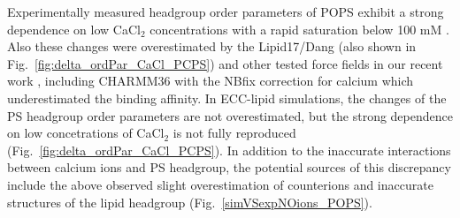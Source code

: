 \documentclass[journal=jpcbfk,manuscript=article]{achemso}
\begin{document}
Experimentally measured headgroup order parameters of POPS exhibit a strong dependence
on low CaCl$_2$ concentrations with a rapid saturation below 100 mM \cite{roux90}.
Also these changes were overestimated by the Lipid17/Dang (also shown in Fig.~\ref{fig:delta_ordPar_CaCl_PCPS})
and other tested force fields in our recent work \cite{NMRlipidsIV}, including CHARMM36 with the NBfix correction for calcium
which underestimated the binding affinity.
In ECC-lipid simulations, the changes of the PS headgroup order parameters are not overestimated,
but the strong dependence on low concetrations of CaCl$_2$ is not fully reproduced (Fig.~\ref{fig:delta_ordPar_CaCl_PCPS}).
In addition to the inaccurate interactions between calcium ions and PS headgroup, the potential sources of this
discrepancy include the above observed slight overestimation of  counterions and
inaccurate structures of the lipid headgroup (Fig.~\ref{simVSexpNOions_POPS}).
\end{document}
